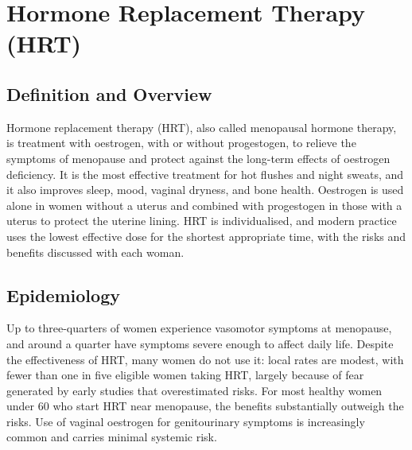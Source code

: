 \chapter{Hormone Replacement Therapy (HRT)}

\section*{Definition and Overview}
Hormone replacement therapy (HRT), also called menopausal hormone therapy, is treatment with oestrogen, with or without progestogen, to relieve the symptoms of menopause and protect against the long-term effects of oestrogen deficiency. It is the most effective treatment for hot flushes and night sweats, and it also improves sleep, mood, vaginal dryness, and bone health. Oestrogen is used alone in women without a uterus and combined with progestogen in those with a uterus to protect the uterine lining. HRT is individualised, and modern practice uses the lowest effective dose for the shortest appropriate time, with the risks and benefits discussed with each woman.

\section*{Epidemiology}
Up to three-quarters of women experience vasomotor symptoms at menopause, and around a quarter have symptoms severe enough to affect daily life. Despite the effectiveness of HRT, many women do not use it: local rates are modest, with fewer than one in five eligible women taking HRT, largely because of fear generated by early studies that overestimated risks. For most healthy women under 60 who start HRT near menopause, the benefits substantially outweigh the risks. Use of vaginal oestrogen for genitourinary symptoms is increasingly common and carries minimal systemic risk.


